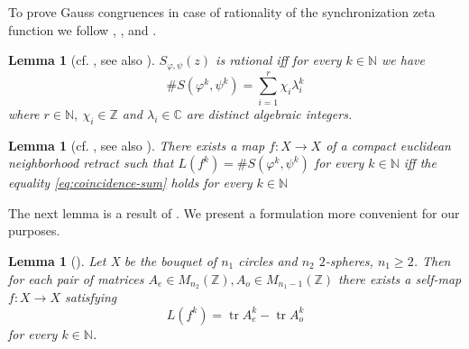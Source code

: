 \documentclass[oneside]{amsart}
\def\N{\mathbb{N}}
\def\Z{\mathbb{Z}}
\def\C{\mathbb{C}}
\def\tr{\operatorname{tr}}
\newtheorem{lem}[thm]{Lemma}
\begin{document}
To prove Gauss congruences in case of rationality of the synchronization zeta function
we follow \cite[Theorem~2.1]{BaBo}, \cite[Theorem~3.1.23, Proposition~3.1.12]{JezMar},
and \cite{FelsSlo24}.

\begin{lem}[cf. , see also ]\label{thm:rational-zeta-coefficients-sum}
  $S_{\varphi, \psi}(z)$ is rational iff for every $k \in \N$ we have
  \begin{equation}\label{eq:coincidence-sum}
    \# S(\varphi^k, \psi^k) = \sum_{i=1}^{r} \chi_i \lambda_i^k
  \end{equation}
  where $r \in \N, \ \chi_i \in \Z$ and $\lambda_i \in \C$ are distinct algebraic integers.
\end{lem}

\begin{lem}[cf. , see also ]\label{thm:coefficients-sum-map-bouquet}
  There exists a map $f: X \to X$ of a compact euclidean neighborhood retract such that
  $L(f^k) = \# S(\varphi^k, \psi^k)$ for every $k \in \N$ iff
  the equality \eqref{eq:coincidence-sum} holds for every $k \in \N$
\end{lem}

The next lemma is a result of \cite[Theorem 2.1]{BaBo}.
We present a formulation more convenient for our purposes.

\begin{lem}[]\label{thm:integer-matrix-map-bouquet}
  Let X be the bouquet of $n_1$ circles and $n_2$ $2$-spheres, $n_1 \geq 2$.
  Then for each pair of matrices $A_e \in M_{n_2}(\Z), A_o \in M_{n_1-1}(\Z)$
  there exists a self-map $f: X \to X$ satisfying
  \[
    L(f^k) = \tr A_e^k - \tr A_o^k
  \]
  for every $k \in \N$.
\end{lem}
\end{document}
